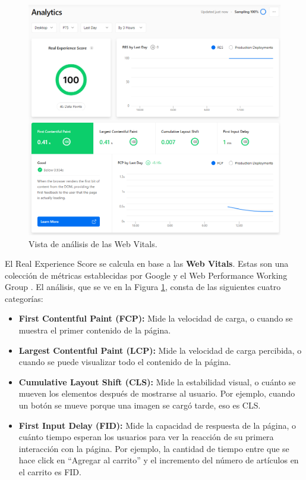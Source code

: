 \documentclass[12pt,twoside,titlepage]{report}
\begin{document}
    \begin{figure}[H]
        \centering
        \includegraphics[scale=0.5]{Vercel/RealExperienceScore}
        \caption{Vista de análisis de las Web Vitals.}
        \label{fig:Vercel_metrics}
    \end{figure}

El Real Experience Score se calcula en base a las \textbf{Web Vitals}. Estas son una colección de métricas establecidas por Google \cite{webdev} y el Web Performance Working Group \cite{w3}. El análisis, que se ve en la Figura \ref{fig:Vercel_metrics}, consta de las siguientes cuatro categorías:
\begin{itemize}
    \item\textbf{First Contentful Paint (FCP):} Mide la velocidad de carga, o cuando se muestra el primer contenido de la página.
    \item\textbf{Largest Contentful Paint (LCP):} Mide la velocidad de carga percibida, o cuando se puede visualizar todo el contenido de la página.
    \item\textbf{Cumulative Layout Shift (CLS):} Mide la estabilidad visual, o cuánto se mueven los elementos después de mostrarse al usuario. Por ejemplo, cuando un botón se mueve porque una imagen se cargó tarde, eso es CLS.
    \item\textbf{First Input Delay (FID):} Mide la capacidad de respuesta de la página, o cuánto tiempo esperan los usuarios para ver la reacción de su primera interacción con la página. Por ejemplo, la cantidad de tiempo entre que se hace click en ``Agregar al carrito'' y el incremento del número de artículos en el carrito es FID.
\end{itemize}
\end{document}
